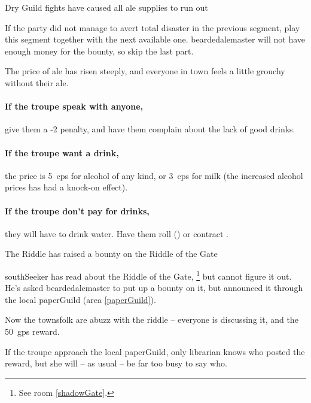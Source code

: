 {\squash Dry}%
{Guild fights have caused all ale supplies to run out}%

If the party did not manage to avert total disaster in the previous \gls{segment}, play this \gls{segment} together with the next available one.
\Gls{beardedalemaster} will not have enough money for the bounty, so skip the last part.

The price of ale has risen steeply, and everyone in \gls{town} feels a little grouchy without their ale.

\paragraph{If the troupe speak with anyone,}
give them a -2 penalty, and have them complain about the lack of good drinks.

\paragraph{If the troupe want a drink,}
the price is 5~\glspl{cp} for alcohol of any kind, or 3~\glspl{cp} for milk (the increased alcohol prices has had a knock-on effect).

\paragraph{If the troupe don't pay for drinks,}
they will have to drink water.
Have them roll  (\tn[10]) or contract \iftoggle{judgement}{Spychoke\exRef{judgement}{Judgement}{diseases}}{a nasty disease}.

{The Riddle}%
{ has raised a bounty on the Riddle of the Gate}%

\Gls{southSeeker} has read about the Riddle of the Gate,%
\footnote{See room \vref{shadowGate}.}
but cannot figure it out.
He's asked \gls{beardedalemaster} to put up a bounty on it, but announced it through the local \gls{paperGuild} (area \vref{paperGuild}).

Now the townsfolk are abuzz with the riddle -- everyone is discussing it, and the 50~\glspl{gp} reward.

\hardestRiddleEver

If the troupe approach the local \gls{paperGuild}, only \gls{librarian} knows who posted the reward, but she will -- as usual -- be far too busy to say who.
